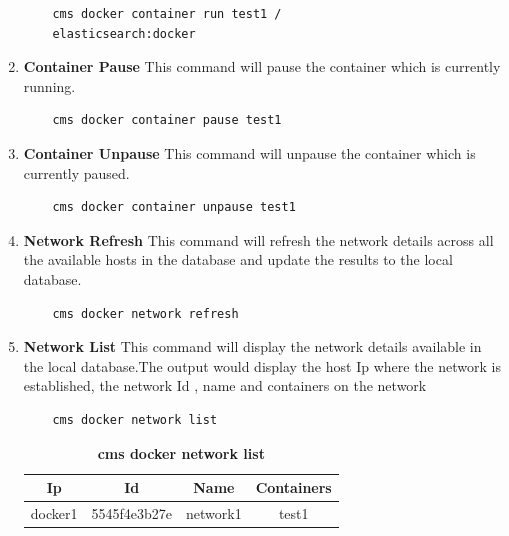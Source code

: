 \documentclass[9pt,twocolumn,twoside]{../../styles/osajnl}
\begin{document}
\begin{enumerate}
    \begin{verbatim}
    cms docker container run test1 /
    elasticsearch:docker
    \end{verbatim}  

    \item \textbf{Container Pause}
     This command will pause the container which is currently running.\\
     
    \begin{verbatim}
    cms docker container pause test1
    \end{verbatim} 

    \item \textbf{Container Unpause}
     This command will unpause the container which is currently paused.
     
    \begin{verbatim}
    cms docker container unpause test1
    \end{verbatim} 

    \item \textbf{Network Refresh}
    This command will refresh the network details across all the available hosts in the database and  update the results to the local database.
    
    \begin{verbatim}
    cms docker network refresh
    \end{verbatim} 

    \item \textbf{Network List}
    This command will display the network details available in the local database.The output would display the host Ip where the network is established, the network Id , name and containers on the network\\

    \begin{verbatim}
    cms docker network list
    \end{verbatim} 
    
    \begin{table}[htbp]
     \caption{\bf cms docker network list }
     \begin{tabular}{cccc}
     \hline
      Ip & Id & Name & Containers\\
      \hline
      docker1 & 5545f4e3b27e & network1 & test1  \\
     \hline
     \end{tabular}
     \label{tab:tab4}
     \end{table}
\end{enumerate}
\end{document}
